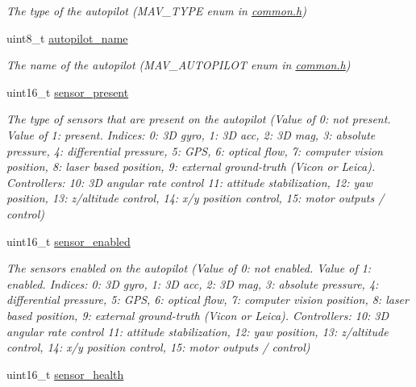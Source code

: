 \begin{DoxyCompactItemize}
\begin{DoxyCompactList}\small\item\em The type of the autopilot (M\+A\+V\+\_\+\+T\+Y\+P\+E enum in \hyperlink{common_8h}{common.\+h}) \end{DoxyCompactList}\item 
\hypertarget{structstate__t_aa3d29a99c490c251e4a843436cd1ea08}{uint8\+\_\+t \hyperlink{structstate__t_aa3d29a99c490c251e4a843436cd1ea08}{autopilot\+\_\+name}}\label{structstate__t_aa3d29a99c490c251e4a843436cd1ea08}

\begin{DoxyCompactList}\small\item\em The name of the autopilot (M\+A\+V\+\_\+\+A\+U\+T\+O\+P\+I\+L\+O\+T enum in \hyperlink{common_8h}{common.\+h}) \end{DoxyCompactList}\item 
\hypertarget{structstate__t_a6c71ae8b67b70320dde99814e0f122ba}{uint16\+\_\+t \hyperlink{structstate__t_a6c71ae8b67b70320dde99814e0f122ba}{sensor\+\_\+present}}\label{structstate__t_a6c71ae8b67b70320dde99814e0f122ba}

\begin{DoxyCompactList}\small\item\em The type of sensors that are present on the autopilot (Value of 0\+: not present. Value of 1\+: present. Indices\+: 0\+: 3\+D gyro, 1\+: 3\+D acc, 2\+: 3\+D mag, 3\+: absolute pressure, 4\+: differential pressure, 5\+: G\+P\+S, 6\+: optical flow, 7\+: computer vision position, 8\+: laser based position, 9\+: external ground-\/truth (Vicon or Leica). Controllers\+: 10\+: 3\+D angular rate control 11\+: attitude stabilization, 12\+: yaw position, 13\+: z/altitude control, 14\+: x/y position control, 15\+: motor outputs / control) \end{DoxyCompactList}\item 
\hypertarget{structstate__t_a19a1370322b790587fe5d5578cbbbf4d}{uint16\+\_\+t \hyperlink{structstate__t_a19a1370322b790587fe5d5578cbbbf4d}{sensor\+\_\+enabled}}\label{structstate__t_a19a1370322b790587fe5d5578cbbbf4d}

\begin{DoxyCompactList}\small\item\em The sensors enabled on the autopilot (Value of 0\+: not enabled. Value of 1\+: enabled. Indices\+: 0\+: 3\+D gyro, 1\+: 3\+D acc, 2\+: 3\+D mag, 3\+: absolute pressure, 4\+: differential pressure, 5\+: G\+P\+S, 6\+: optical flow, 7\+: computer vision position, 8\+: laser based position, 9\+: external ground-\/truth (Vicon or Leica). Controllers\+: 10\+: 3\+D angular rate control 11\+: attitude stabilization, 12\+: yaw position, 13\+: z/altitude control, 14\+: x/y position control, 15\+: motor outputs / control) \end{DoxyCompactList}\item 
\hypertarget{structstate__t_a381851f2b0efdd6c4f5588ac10794232}{uint16\+\_\+t \hyperlink{structstate__t_a381851f2b0efdd6c4f5588ac10794232}{sensor\+\_\+health}}\label{structstate__t_a381851f2b0efdd6c4f5588ac10794232}


\end{DoxyCompactItemize}
